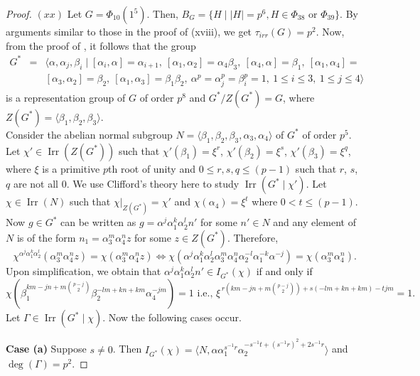 \documentclass[a4paper,11pt]{amsart}
\numberwithin{equation}{section}
\numberwithin{equation}{subsection}
\begin{document}
\begin{proof}
$(xx)$ Let $G= \Phi_{10}(1^5)$. Then, $B_{G}=\{H \mid |H|= p^6, H \in \Phi_{38} \text{ or } \Phi_{39}\}$. By arguments similar to those in the proof of (xviii), we get $\tau_{irr}(G)=p^2$. 
Now, from the proof of \cite[Lemma 4.2]{hatuip5}, it follows that the group
\begin{eqnarray*}
	G^* &=&\langle \alpha, \alpha_j, \beta_i
	\mid [\alpha_i,\alpha] = \alpha_{i+1},\ 
	[\alpha_1,\alpha_2] = \alpha_4 \beta_3,\ 
	[\alpha_4,\alpha] = \beta_1,\ [\alpha_1,\alpha_4] = \\ 
	&& [\alpha_3,\alpha_2] = \beta_2,\  [\alpha_1,\alpha_3] = \beta_1 \beta_2,\ \alpha^p = \alpha_{j}^p = \beta_i^p = 1,\ 1 \le i \le 3,\ 1 \le j \le 4 \rangle
\end{eqnarray*} 
is a representation group of $G$ of order $p^8$ and $G^*/Z({G}^*) = G$, where $Z({G}^*) = \langle \beta_1, \beta_2, \beta_3 \rangle$.  \\
Consider the abelian normal subgroup
$N = \langle \beta_1, \beta_2, \beta_3, \alpha_3, \alpha_4 \rangle$ of ${G}^*$ of order $p^5$. 
Let $\chi' \in \operatorname{Irr}(Z({G}^*))$ such that $\chi'(\beta_1) = \xi^{r}$, $\chi'(\beta_2) = \xi^{s}$, $\chi'(\beta_3)= \xi^q$, where $\xi$ is a primitive $p$th root of unity and $0 \le r, s, q \le (p-1)$ such that $r$, $s$, $q$ are  not all $0$.
We use Clifford's theory here to study $\operatorname{Irr}(G^* \mid \chi')$. 
Let $\chi \in \operatorname{Irr}(N)$ such that
$\chi|_{Z({G}^*)} = \chi'$ and $\chi(\alpha_4) = \xi^t$ where $0 < t \le (p-1)$. Now $g \in {G}^*$ can be written as $g = \alpha^j \alpha_1^k \alpha_2^l n'$ for some $n' \in N$ and any element of $N$ is of the form $n_1 = \alpha_3^m \alpha_4^n z$ for some $z \in Z({G}^*)$.
Therefore,
\[
\chi^{\alpha^j \alpha_1^k \alpha_2^l}(\alpha_3^m \alpha_4^n  z)
= \chi(\alpha_3^m \alpha_4^n z)
\iff
\chi(\alpha^j \alpha_1^k \alpha_2^l \alpha_3^m \alpha_4^n \alpha_2^{-l} \alpha_1^{-k} \alpha^{-j})
= \chi(\alpha_3^m \alpha_4^n).\]
Upon simplification,  we obtain that
$\alpha^j \alpha_1^k \alpha_2^l n' \in I_{{G}^*}(\chi)$
if and only if
\[
\chi(\beta_1^{km-jn+m\binom{p-j}{2}} \beta_2^{-lm+kn+km} \alpha_4^{-jm}) = 1
\text{ i.e., } 
\xi^{\,r(km-jn+m\binom{p-j}{2})+s(-lm+kn+km)-tjm} = 1.
\] Let $\Gamma \in \operatorname{Irr}(G^* \mid \chi)$. Now the following cases occur.

\textbf{Case (a)} Suppose $s\neq 0$. Then $I_{{G}^*}(\chi) = \langle N, \alpha\alpha_1^{s^{-1}r}\alpha_2^{-s^{-1}t+(s^{-1}r)^2+2s^{-1}r} \rangle$ and $\deg(\Gamma)=p^2$.


\end{proof}
\end{document}
